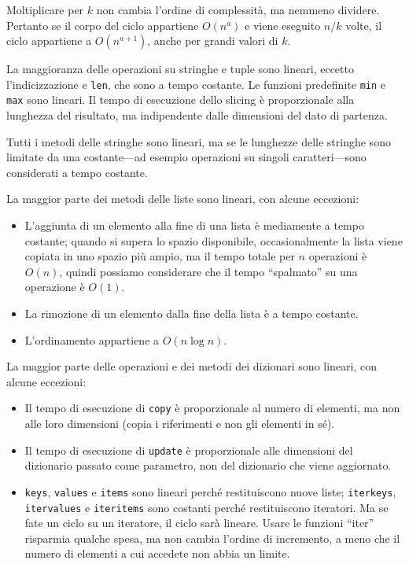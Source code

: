\documentclass[10pt]{book}
\begin{document}
Moltiplicare per $k$ non cambia l'ordine di complessità, ma nemmeno dividere. Pertanto se il corpo del ciclo appartiene $O(n^a)$ e viene eseguito
$n/k$ volte, il ciclo appartiene a $O(n^{a+1})$, anche per grandi valori di $k$.

La maggioranza delle operazioni su stringhe e tuple sono lineari, eccetto l'indicizzazione e {\tt   len}, che sono a tempo costante. Le funzioni predefinite {\tt min} e {\tt max} sono lineari. Il tempo di esecuzione dello slicing è proporzionale alla lunghezza del risultato, ma indipendente dalle dimensioni del dato di partenza.


Tutti i metodi delle stringhe sono lineari, ma se le lunghezze delle stringhe sono limitate da una costante---ad esempio operazioni su singoli caratteri---sono considerati a tempo costante.

La maggior parte dei metodi delle liste sono lineari, con alcune eccezioni:

\begin{itemize}

\item L'aggiunta di un elemento alla fine di una lista è mediamente a tempo costante; quando si supera lo spazio disponibile, occasionalmente la lista viene copiata in uno spazio più ampio, ma il tempo totale per $n$ operazioni è $O(n)$, quindi possiamo considerare che il tempo ``spalmato'' su una operazione è $O(1)$.

\item La rimozione di un elemento dalla fine della lista è a tempo costante.

\item L'ordinamento appartiene a $O(n \log n)$.

\end{itemize}

La maggior parte delle operazioni e dei metodi dei dizionari sono lineari, con alcune eccezioni:

\begin{itemize}

\item Il tempo di esecuzione di {\tt copy} è proporzionale al numero di elementi, ma non alle loro dimensioni (copia i riferimenti e non gli elementi in sé).

\item Il tempo di esecuzione di {\tt update} è proporzionale alle dimensioni del dizionario passato come parametro, non del dizionario che viene aggiornato.

\item {\tt keys}, {\tt values} e {\tt items} sono lineari perché restituiscono nuove liste; {\tt iterkeys}, {\tt itervalues} e {\tt iteritems} sono costanti perché restituiscono iteratori. Ma se fate un ciclo su un iteratore, il ciclo sarà lineare. Usare le funzioni ``iter'' risparmia qualche spesa, ma non cambia l'ordine di incremento, a meno che il numero di elementi a cui accedete non abbia un limite.

\end{itemize}
\end{document}
